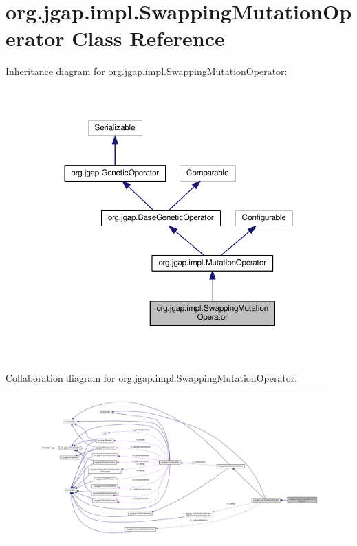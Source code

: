 \hypertarget{classorg_1_1jgap_1_1impl_1_1_swapping_mutation_operator}{\section{org.\-jgap.\-impl.\-Swapping\-Mutation\-Operator Class Reference}
\label{classorg_1_1jgap_1_1impl_1_1_swapping_mutation_operator}
}


Inheritance diagram for org.\-jgap.\-impl.\-Swapping\-Mutation\-Operator\-:
\nopagebreak
\begin{figure}[H]
\begin{center}
\leavevmode
\includegraphics[width=350pt]{classorg_1_1jgap_1_1impl_1_1_swapping_mutation_operator__inherit__graph}
\end{center}
\end{figure}


Collaboration diagram for org.\-jgap.\-impl.\-Swapping\-Mutation\-Operator\-:
\nopagebreak
\begin{figure}[H]
\begin{center}
\leavevmode
\includegraphics[width=350pt]{classorg_1_1jgap_1_1impl_1_1_swapping_mutation_operator__coll__graph}
\end{center}
\end{figure}
